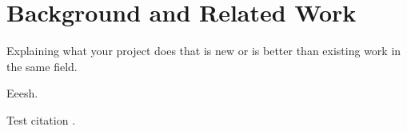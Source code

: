 \chapter{Background and Related Work}

\label{ch:background} 

Explaining what your project does that is new or is better than existing work in the same field.

Eeesh.

Test citation \cite{cormen2009introduction}.